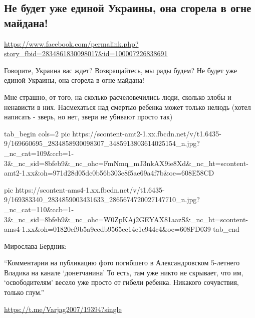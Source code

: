  
 
 
 
 

\subsection{Не будет уже единой Украины, она сгорела в огне майдана!}
\url{https://www.facebook.com/permalink.php?story_fbid=2834861830098017&id=100007226838691}

Говорите, Украина вас ждет? Возвращайтесь, мы рады будем? Не будет уже единой Украины, она сгорела в огне майдана!

Мне страшно, от того, на сколько расчеловечились люди, сколько злобы и
ненависти в них. Насмехаться над смертью ребенка может только нелюдь (хотел
написать - зверь, но нет, звери не убивают просто так)

\ifcmt
  tab_begin cols=2
    pic https://scontent-amt2-1.xx.fbcdn.net/v/t1.6435-9/169660695_2834858930098307_3485913803614025154_n.jpg?_nc_cat=109&ccb=1-3&_nc_sid=8bfeb9&_nc_ohc=FmNmq_mJ3nkAX9ie8Xd&_nc_ht=scontent-amt2-1.xx&oh=971d28d05dc0b56b303e8f5ae69a4f7b&oe=608E58CD

    pic https://scontent-ams4-1.xx.fbcdn.net/v/t1.6435-9/169383340_2834859003431633_2865674720027147710_n.jpg?_nc_cat=110&ccb=1-3&_nc_sid=8bfeb9&_nc_ohc=W0ZpKAj2GEYAX81aazS&_nc_ht=scontent-ams4-1.xx&oh=01820ef9b5a9ccdb9565ec14e1c944c4&oe=608FD039
  tab_end
\fi

Мирослава Бердник:

\enquote{Комментарии на публикацию фото погибшего в Александровском 5-летнего Владика на канале \enquote{донетчанина} 
То есть, там уже никто не скрывает, что им, \enquote{освободителям} 
весело уже просто от гибели ребенка. Никакого сочувствия, только глум.}

\url{https://t.me/Varjag2007/19394?single}
